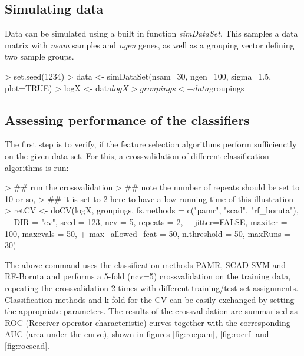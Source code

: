 \documentclass[11pt,a4paper]{article}
\begin{document}
\subsection{Simulating data}
Data can be simulated using a built in function \emph{simDataSet}. This samples a data matrix with \emph{nsam} samples and \emph{ngen} genes, as well as a grouping vector defining two sample groups.

\begin{Schunk}
\begin{Sinput}
> set.seed(1234)
> data <- simDataSet(nsam=30, ngen=100, sigma=1.5, plot=TRUE)
> logX <- data$logX
> groupings <- data$groupings
\end{Sinput}
\end{Schunk}

\subsection{Assessing performance of the classifiers}

The first step is to verify, if the feature selection algorithms perform sufficienctly on the given data set. For this, a crossvalidation of different classification algorithms is run:

\begin{Schunk}
\begin{Sinput}
> ## run the crossvalidation
> ## note the number of repeats should be set to 10 or so, 
> ## it is set to 2 here to have a low running time of this illustration
> retCV <- doCV(logX, groupings, fs.methods = c("pamr", "scad", "rf_boruta"), 
+ 	DIR = "cv", seed = 123, ncv = 5, repeats = 2, 
+ 	jitter=FALSE, maxiter = 100, maxevals = 50, 
+ 	max_allowed_feat = 50, n.threshold = 50, maxRuns = 30)
\end{Sinput}
\end{Schunk}

The above command uses the classification methods PAMR, SCAD-SVM and RF-Boruta and performs a 5-fold (ncv=5) crossvalidation on the training data, repeating the crossvalidation 2 times with different training/test set assignments. Classification methods and k-fold for the CV can be easily exchanged by setting the appropriate parameters. The results of the crossvalidation are summarised as ROC (Receiver operator characteristic) curves together with the corresponding AUC (area under the curve), shown in figures \ref{fig:rocpam}, \ref{fig:rocrf} and \ref{fig:rocscad}.
\end{document}
